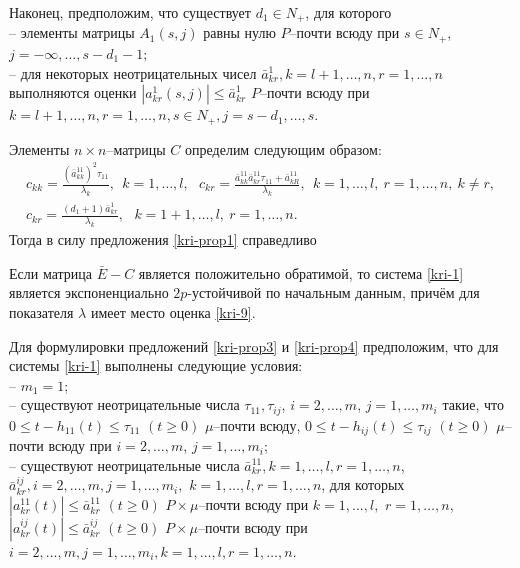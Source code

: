  Наконец, предположим, что существует $d_1 \in N_+$, для которого\\
 \noindent
  -- элементы
матрицы $A_1(s,j)$ равны нулю $P$--почти всюду при $ s \in N_+$,
$j=-\infty,\dots,s-d_1-1$;\\
 -- для некоторых неотрицательных чисел $\bar a^1_{kr}, k = l+1, \dots,
n, r = 1,\dots,n$ выполняются оценки $|a^1_{kr}(s,j)| \leq \bar
a^1_{kr}$ $P$--почти всюду при $ k = l+1, \dots, n, r = 1,\dots,n, s\in
N_+, j=s-d_1,\dots,s $.

Элементы $n\times n$--матрицы $C$ определим следующим образом:
$$
\begin{array}{crl}
c_{kk} = \frac{(\bar a^{11}_{kk})^2\tau_{11}}{\lambda _k }, \ \ k =
1,\dots,l, \ \ \ c_{kr} = \frac{\bar a^{11}_{kk}\bar a^{11}_{kr}\tau
_{11} + \bar a^{11}_{kR}}{\lambda _k }, \ \ k =
1,\dots,l,\ r = 1, \dots, n, \ k \neq r,\\
 c_{kr} = \frac{(d_1+1)\bar a^{1}_{kr}}{\lambda_k}, \ \ \ k = 1 + 1,\dots,l, \ r = 1, \dots,
 n.
\end{array}
$$
Тогда в силу предложения \ref{kri-prop1} справедливо

\begin{proposition}\label{kri-prop2}  Если матрица $\bar E - C$ является
положительно обратимой, то система \eqref{kri-1} является экспоненциально
${2p}$-устойчивой по начальным данным, причём для показателя
$\lambda$ имеет место оценка \eqref{kri-9}.
\end{proposition}

Для формулировки предложений \ref{kri-prop3} и \ref{kri-prop4} предположим, что для системы \eqref{kri-1} выполнены следующие условия:\\
\noindent
  -- $m_1 =1$;\\
   -- существуют неотрицательные числа
$\tau_{11}, \tau_{ij}$, $i = 2,\dots,m$, $j = 1,\dots,m_i$  такие, что
$0 \leq t- h_{11}(t) \leq \tau _{11} {\,} {\,} (t \geq 0)$ $\mu
$--почти всюду, $0 \leq t- h_{ij}(t) \leq \tau _{ij} {\,} {\,} (t
\geq 0)$ $\mu $--почти всюду при $i = 2,\dots,m$, $j = 1,\dots,m_i$;\\
  -- существуют неотрицательные числа
$\bar a^{11}_{kr},  k =1,\dots,l, r = 1,\dots,n$, $\bar a^{ij}_{kr}, i =
2,\dots,m, j = 1,\dots,m_i,$ $k =1,\dots,l, r = 1,\dots,n$,  для которых
$|a^{11}_{kr}(t)|\leq \bar a^{11}_{kr} \,\, (t\geq 0) $
$P\times\mu$--почти всюду при $k =1,\dots,l,$ $r = 1,\dots,n$,
$|a^{ij}_{kr}(t)| \leq \bar a^{ij}_{kr} \,\, (t\geq 0) $
$P\times\mu$--почти всюду при $i = 2, \dots, m, j = 1,\dots,m_i, k
=1,\dots,l, r = 1,\dots,n$.

